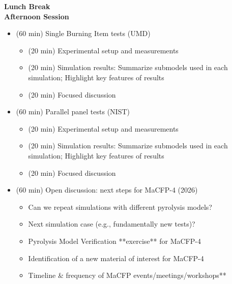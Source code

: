 \documentclass[12pt]{article}
\begin{document}
\textbf{Lunch Break}\\		

\textbf{Afternoon Session}
\begin{itemize}[noitemsep]
\item (60 min) Single Burning Item tests (UMD)
\begin{itemize}[noitemsep]
\item (20 min) Experimental setup and measurements
\item (20 min) Simulation results: Summarize submodels used in each simulation; Highlight key features of results
\item (20 min) Focused discussion 
\end{itemize}
\item (60 min) Parallel panel tests (NIST)
\begin{itemize}[noitemsep]
\item (20 min) Experimental setup and measurements
\item (20 min) Simulation results: Summarize submodels used in each simulation; Highlight key features of results
\item (20 min) Focused discussion 
\end{itemize}
\item (60 min) Open discussion: next steps for MaCFP-4 (2026)
\begin{itemize}[noitemsep]
\item Can we repeat simulations with different pyrolysis models?
\item Next simulation case (e.g., fundamentally new tests)?
\item Pyrolysis Model Verification **exercise** for MaCFP-4
\item Identification of a new material of interest for MaCFP-4
\item Timeline \& frequency of MaCFP events/meetings/workshops**
\end{itemize}
\end{itemize}
\end{document}
